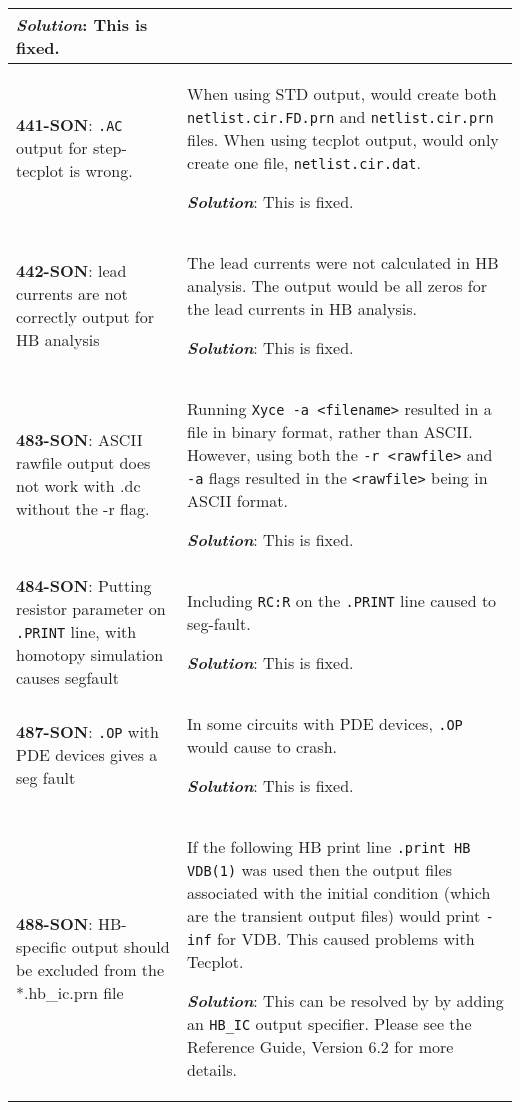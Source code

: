 \begin{longtable}[h] {>{\raggedright\small}m{2in}|>{\raggedright\let\\\tabularnewline\small}m{3.5in}}
\textbf{\textit{Solution}}: This is fixed.
\\ \hline

\textbf{441-SON}: \texttt{.AC} output for step-tecplot is wrong. &  When
using STD output, \Xyce{} would create both \texttt{netlist.cir.FD.prn} and 
\texttt{netlist.cir.prn} files.  When using tecplot output, \Xyce{} would
only create one file, \texttt{netlist.cir.dat}.

\textbf{\textit{Solution}}: This is fixed.
\\ \hline

\textbf{442-SON}: lead currents are not correctly output for HB analysis &

The lead currents were not calculated in HB analysis. The output would be
all zeros for the lead currents in HB analysis.

\textbf{\textit{Solution}}: This is fixed.
\\ \hline

\textbf{483-SON}: ASCII rawfile output does not work with .dc without the
-r flag. &  Running \texttt{Xyce -a <filename>} resulted in a file in
binary format, rather than ASCII. However, using both the \texttt{-r <rawfile>}
and \texttt{-a} flags resulted in the \texttt{<rawfile>} being in ASCII format.

\textbf{\textit{Solution}}: This is fixed.
\\ \hline

\textbf{484-SON}: Putting resistor parameter on \texttt{.PRINT} line, with
homotopy simulation causes segfault &  Including \texttt{RC:R} on the 
\texttt{.PRINT} line caused \Xyce{} to seg-fault.

\textbf{\textit{Solution}}: This is fixed.
\\ \hline

\textbf{487-SON}: \texttt{.OP} with PDE devices gives a seg fault & In some 
circuits with PDE devices, \texttt{.OP} would cause \Xyce{} to crash.

\textbf{\textit{Solution}}: This is fixed.
\\ \hline

\textbf{488-SON}: HB-specific output should be excluded from the *.hb\_ic.prn
file & If the following HB print line \texttt{.print HB VDB(1)} was used
then the output files associated with the initial condition (which are
the transient output files) would print \texttt{-inf} for VDB.  This caused problems
with Tecplot. 

\textbf{\textit{Solution}}: This can be resolved by by adding an 
\texttt{HB\_IC} output specifier.  Please see the \Xyce{} Reference Guide,
Version 6.2 for more details.
\\ \hline


\end{longtable}
